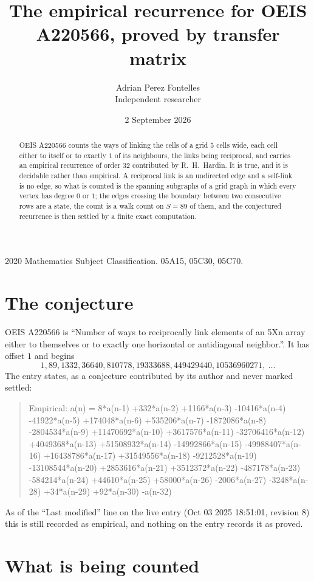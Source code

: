 \documentclass[11pt,a4paper]{article}
\title{The empirical recurrence for OEIS A220566, proved by transfer matrix}
\author{Adrian Perez Fontelles\\ \small Independent researcher}
\date{2 September 2026}
\theoremstyle{plain}
\theoremstyle{definition}
\begin{document}
\maketitle

\begin{abstract}
OEIS A220566 counts the ways of linking the cells of a grid $5$ cells wide, each cell either to
itself or to exactly $1$ of its neighbours, the links being reciprocal, and carries an
empirical recurrence of order $32$ contributed by R.~H.~Hardin. It is true, and it is
decidable rather than empirical. A reciprocal link is an undirected edge and a self-link is
no edge, so what is counted is the spanning subgraphs of a grid graph in which every vertex
has degree $0$ or $1$; the edges crossing the boundary between two consecutive rows are a
state, the count is a walk count on $S=89$ of them, and the conjectured recurrence is then
settled by a finite exact computation.
\end{abstract}

\noindent\small 2020 Mathematics Subject Classification. 05A15, 05C30, 05C70.\normalsize

\section{The conjecture}

OEIS A220566 is ``Number of ways to reciprocally link elements of an 5Xn array either to themselves or to exactly one horizontal or antidiagonal neighbor.''. It has offset $1$ and begins
\[
1, 89, 1332, 36640, 810778, 19333688, 449429440, 10536960271,\ \dots
\]
The entry states, as a conjecture contributed by its author and never marked settled:
\begin{quote}
Empirical: a(n) = 8*a(n-1) +332*a(n-2) +1166*a(n-3) -10416*a(n-4) -41922*a(n-5) +174048*a(n-6) +535206*a(n-7) -1872086*a(n-8) -2804534*a(n-9) +11470692*a(n-10) +3617576*a(n-11) -32706416*a(n-12) +4049368*a(n-13) +51508932*a(n-14) -14992866*a(n-15) -49988407*a(n-16) +16438786*a(n-17) +31549556*a(n-18) -9212528*a(n-19) -13108544*a(n-20) +2853616*a(n-21) +3512372*a(n-22) -487178*a(n-23) -584214*a(n-24) +44610*a(n-25) +58000*a(n-26) -2006*a(n-27) -3248*a(n-28) +34*a(n-29) +92*a(n-30) -a(n-32)
\end{quote}
As of the ``Last modified'' line on the live entry (Oct 03 2025 18:51:01, revision 8) this is still
recorded as empirical, and nothing on the entry records it as proved.

\section{What is being counted}
\end{document}
